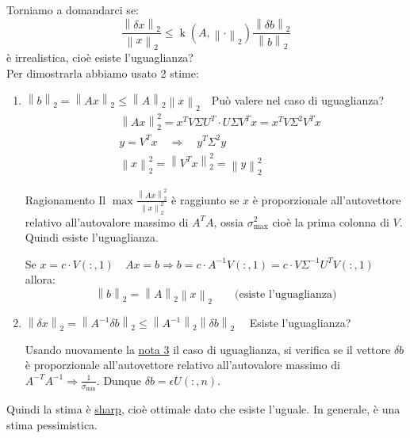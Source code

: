 \documentclass{article}
\begin{document}
Torniamo a domandarci se:$$\frac{\left\|\delta x\right\|_2}{\left\|x\right\|_2}\le\operatorname{k}\left(A,\left\|\cdot\right\|_2\right)\frac{\left\|\delta b\right\|_2}{\left\|b\right\|_2}$$
è irrealistica, cioè esiste l'uguaglianza?\\
Per dimostrarla abbiamo usato 2 stime:
\begin{enumerate}
    \item $\left\|b\right\|_2=\left\|Ax\right\|_2\le\left\|A\right\|_2\left\|x\right\|_2\quad$Può valere nel caso di uguaglianza?
          \begin{align*}
               & \left\|Ax\right\|_2^2=x^TV\Sigma U^T\cdot U\Sigma V^Tx=x^TV\Sigma^2V^Tx \\
               & y=V^Tx\quad\Rightarrow\quad y^T\Sigma^2y                                \\
               & \left\|x\right\|_2^2=\left\|V^Tx\right\|_2^2=\left\|y\right\|_2^2
          \end{align*}
          \begin{note}{Ragionamento}{}
              Il $\max\frac{\left\|Ax\right\|_2^2}{\left\|x\right\|_2^2}$ è raggiunto se $x$ è proporzionale all'autovettore relativo all'autovalore massimo di $A^TA$, ossia $\sigma_{\mathrm{max}}^2$ cioè la prima colonna di $V$.
              Quindi esiste l'uguaglianza.
          \end{note}

          Se $x=c\cdot V(:,1)\quad Ax=b\Rightarrow b=c\cdot A^{-1}V(:,1)=c\cdot V\Sigma^{-1} U^TV(:,1)$ allora:
          \[\left\|b\right\|_2=\left\|A\right\|_2\left\|x\right\|_2\qquad\text{(esiste l'uguaglianza)}\]

    \item $\left\|\delta x\right\|_2=\left\|A^{-1}\delta b\right\|_2\le\left\|A^{-1}\right\|_2\left\|\delta b\right\|_2\quad$ Esiste l'uguaglianza?

          Usando nuovamente la \underline{nota 3} il caso di uguaglianza, si verifica se il vettore $\delta b$ è proporzionale all'autovettore relativo all'autovalore
          massimo di $A^{-T}A^{-1}\Rightarrow\frac{1}{\sigma_{\mathrm{min}}}$. Dunque $\delta b=\epsilon U(:,n)$.
\end{enumerate}

Quindi la stima è \underline{sharp}, cioè ottimale dato che esiste l'uguale. In generale, è una stima pessimistica.
\end{document}
